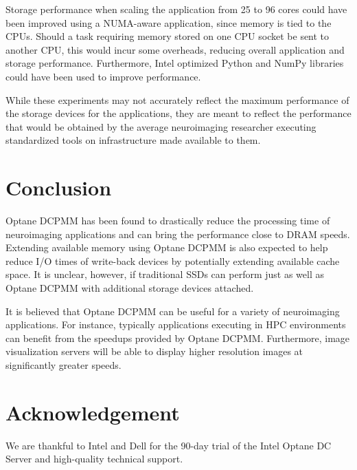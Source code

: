 \documentclass[conference]{IEEEtran}
\begin{document}
Storage performance when scaling the application from 25 to 96 cores could have been improved using a
NUMA-aware application, since memory is tied to the CPUs. Should a task requiring memory
stored on one CPU socket be sent to another CPU, this would incur some overheads, reducing overall application
and storage performance. Furthermore, Intel optimized Python and NumPy libraries could have been used to improve 
performance.

While these experiments may not accurately reflect the maximum performance of the storage devices for the applications,
they are meant to reflect the performance that would be obtained by the average neuroimaging researcher
executing standardized tools on infrastructure made available to them.

\section{Conclusion}

Optane DCPMM has been found to drastically reduce the processing time of neuroimaging applications and
can bring the performance close to DRAM speeds. Extending available memory using Optane DCPMM is also 
expected to help reduce I/O times of write-back devices by potentially extending available cache space.
It is unclear, however, if traditional SSDs can perform just as well as Optane DCPMM with additional storage devices
attached.

It is believed that Optane DCPMM can be useful for a variety of neuroimaging applications. For
instance, typically applications executing in HPC environments can benefit from 
the speedups provided by Optane DCPMM. Furthermore, image visualization servers will be able
to display higher resolution images at significantly greater speeds.
\section{Acknowledgement}
We are thankful to Intel and Dell
for the 90-day trial of the Intel Optane DC Server and high-quality technical support.
 

\end{document}
